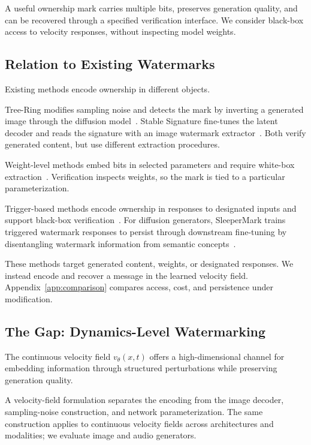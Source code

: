 \documentclass[11pt]{article}
\begin{document}
A useful ownership mark carries multiple bits, preserves generation
quality, and can be recovered through a specified verification
interface. We consider black-box access to velocity responses, without
inspecting model weights.

\subsection{Relation to Existing Watermarks}\label{sec:related}

Existing methods encode ownership in different objects.

Tree-Ring modifies sampling noise and detects the mark by inverting a
generated image through the diffusion model~\cite{wen2023tree}.
Stable Signature fine-tunes the latent decoder and reads the signature
with an image watermark extractor~\cite{fernandez2023stable}.
Both verify generated content, but use different extraction procedures.

Weight-level methods embed bits in selected parameters and require
white-box extraction~\cite{uchida2017embedding}. Verification inspects
weights, so the mark is tied to a particular parameterization.

Trigger-based methods encode ownership in responses to designated
inputs and support black-box verification~\cite{adi2018turning,chen2019blackmarks,fei2025high}.
For diffusion generators, SleeperMark trains triggered watermark
responses to persist through downstream fine-tuning by disentangling
watermark information from semantic concepts~\cite{wang2024sleepermark}.

These methods target generated content, weights, or designated
responses. We instead encode and recover a message in the learned
velocity field. Appendix~\ref{app:comparison} compares access,
cost, and persistence under modification.

\subsection{The Gap: Dynamics-Level Watermarking}

The continuous velocity field $v_\theta(x,t)$ offers a
high-dimensional channel for embedding information through structured
perturbations while preserving generation quality.

A velocity-field formulation separates the encoding from the image
decoder, sampling-noise construction, and network parameterization.
The same construction applies to continuous velocity fields across
architectures and modalities; we evaluate image and audio generators.
\end{document}
